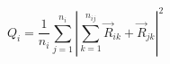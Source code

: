 \documentclass[12pt]{article}
\begin{document}
$$
   Q_{i} = \frac{1}{n_i}\sum_{j = 1}^{n_i} | \sum_{k = 1}^{n_{ij}}  \vec{R}_{ik} + \vec{R}_{jk} |^2
$$
\end{document}
